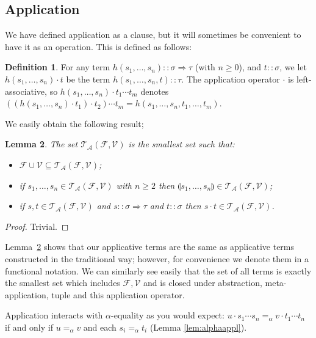 \documentclass{lmcs}
\theoremstyle{theorem}\newtheorem{theorem}{Theorem}
\theoremstyle{theorem}\newtheorem{lemma}[theorem]{Lemma}
\theoremstyle{theorem}\newtheorem{corollary}[theorem]{Corollary}
\theoremstyle{definition}\newtheorem{definition}[theorem]{Definition}
\theoremstyle{definition}\newtheorem{example}[theorem]{Example}
\newcommand{\F}{\mathcal{F}}
\newcommand{\V}{\mathcal{V}}
\newcommand{\ATerms}{\mathcal{T}_{\mathcal{A}}}
\newcommand{\atype}{\sigma}
\newcommand{\btype}{\tau}
\newcommand{\tuple}[2]{\llparenthesis #1,\dots,#2 \rrparenthesis}
\newcommand{\arrtype}{\Rightarrow}
\begin{document}
\subsection{Application}\label{subsec:application}
We have defined application as a clause, but it will sometimes be convenient to
have it as an operation.  This is defined as follows:

\begin{definition}
For any term $h(s_1,\dots,s_n) :: \atype \arrtype \btype$ (with $n \geq 0$),
and $t :: \atype$, we let $h(s_1,\dots,s_n) \cdot t$ be the term
$h(s_1,\dots,s_n,t) :: \btype$.
The application operator $\cdot$ is left-associative, so $h(s_1,\dots,s_n)
\cdot t_1 \cdots t_m$ denotes $((h(s_1,\dots,s_n) \cdot t_1) \cdot t_2) \cdots
t_m = h(s_1,\dots,s_n,t_1,\dots,t_m)$.
\end{definition}

We easily obtain the following result;

\begin{lemma}\label{lem:applicative_notation}
The set $\ATerms(\F,\V)$ is the smallest set such that:
\begin{itemize}
\item $\F \cup \V \subseteq \ATerms(\F,\V)$;
\item if $s_1,\dots,s_n \in \ATerms(\F,\V)$ with $n \geq 2$ then
  $\tuple{s_1}{s_n} \in \ATerms(\F,\V)$;
\item if $s,t \in \ATerms(\F,\V)$ and $s :: \atype \arrtype \btype$ and $t ::
  \atype$ then $s \cdot t \in \ATerms(\F,\V)$.
\end{itemize}
\end{lemma}

\begin{proof}
Trivial.
\end{proof}

Lemma~\ref{lem:applicative_notation} shows that our applicative terms are the
same as applicative terms constructed in the traditional way; however, for
convenience we denote them in a functional notation.
We can similarly see easily that the set of all terms is exactly the smallest
set which includes $\F,\V$ and is closed under abstraction, meta-application,
tuple and this application operator.

Application interacts with $\alpha$-equality as you would expect: $u \cdot s_1
\cdots s_n =_\alpha v \cdot t_1 \cdots t_n$ if and only if $u =_\alpha v$ and
each $s_i =_\alpha t_i$ (Lemma \ref{lem:alphaappl}).
\end{document}

